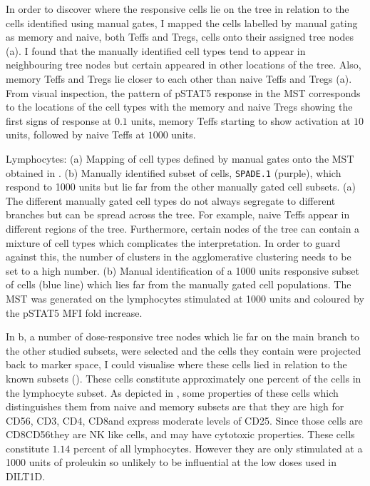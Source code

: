 In order to discover where the responsive cells lie on the tree in relation to the cells identified using manual gates, I mapped
the cells labelled by manual gating as memory and naive, both Teffs and Tregs, cells onto their assigned tree nodes (a).
I found that the manually identified cell types tend to appear in neighbouring tree nodes but certain appeared in other locations of the tree.
Also, memory Teffs and Tregs lie closer to each other than naive Teffs and Tregs (a).
From visual inspection, the pattern of pSTAT5 response in the \gls{MST} corresponds to the locations of the cell types
with the memory and naive Tregs showing the first signs of response at $0.1$ units, memory Teffs starting to show activation at $10$ units,
followed by naive Teffs at $1000$ units.

{ Lymphocytes:
(a) Mapping of cell types defined by manual gates onto the \gls{MST} obtained in .
(b) Manually identified subset of cells, \texttt{SPADE.1} (purple), which respond to 1000 units but lie far from the other manually gated cell subsets.
}
{
(a)
The different manually gated cell types do not always segregate to different branches but can be spread across the tree.
For example, naive Teffs appear in different regions of the tree.
Furthermore, certain nodes of the tree can contain a mixture of cell types which complicates the interpretation.
In order to guard against this, the number of clusters in the agglomerative clustering needs to be set to a high number.
(b)
Manual identification of a 1000 units responsive subset of cells (blue line) which lies far from the manually gated cell populations.
The \gls{MST} was generated on the lymphocytes stimulated at 1000 units and coloured by the pSTAT5 MFI fold increase.
}

In b, a number of dose-responsive tree nodes which lie far on the main branch to the other studied subsets,
were selected and the cells they contain were projected back to marker space, I could visualise where these cells lied in relation to the
known subsets ().
These cells constitute approximately one percent of the cells in the lymphocyte subset.
As depicted in , some properties of these cells which distinguishes them from 
naive and memory subsets are that they are high for CD56, CD3\negative, CD4\negative, CD8\positive and express moderate levels of CD25.
Since those cells are CD8\positive CD56\positive they are \gls{NK} like cells, and may have cytotoxic properties.
These cells constitute $1.14$ percent of all lymphocytes.
However they are only stimulated at a 1000 units of proleukin so unlikely to be influential at the low doses used in DILT1D.

